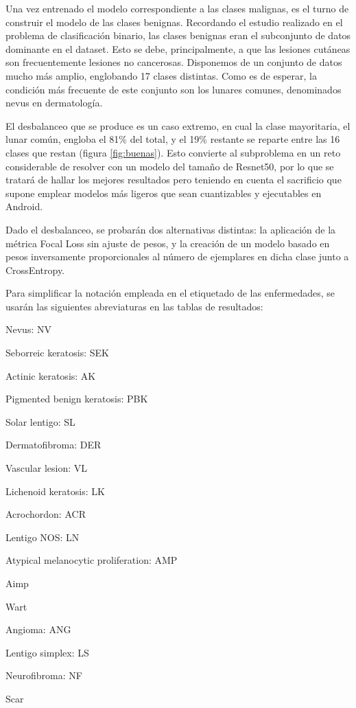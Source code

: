 Una vez entrenado el modelo correspondiente a las clases malignas, es el turno de construir el modelo de las clases benignas. Recordando el estudio realizado en el problema de clasificación binario, las clases benignas eran el subconjunto de datos dominante en el dataset. Esto se debe, principalmente, a que las lesiones cutáneas son frecuentemente lesiones no cancerosas. Disponemos de un conjunto de datos mucho más amplio, englobando 17 clases distintas.  Como es de esperar, la condición más frecuente de este conjunto son los lunares comunes, denominados nevus en dermatología.

El desbalanceo que se produce es un caso extremo, en cual la clase mayoritaria, el lunar común, engloba el 81\% del total, y el 19\% restante se reparte entre las 16 clases que restan (figura  \ref{fig:buenas}). Esto convierte al subproblema en un reto considerable de resolver con un modelo del tamaño de Resnet50, por lo que se tratará de hallar los mejores resultados pero teniendo en cuenta el sacrificio que supone emplear modelos más ligeros que sean cuantizables y ejecutables en Android.

Dado el desbalanceo, se probarán dos alternativas distintas: la aplicación de la métrica Focal Loss sin ajuste de pesos, y la creación de un modelo basado en pesos inversamente proporcionales al número de ejemplares en dicha clase junto a CrossEntropy.

Para simplificar la notación empleada en el etiquetado de las enfermedades, se usarán las siguientes abreviaturas en las tablas de resultados:
\begin{multiitem}
	\item Nevus: NV
	\item Seborreic keratosis: SEK 
	\item Actinic keratosis: AK            
	\item Pigmented benign keratosis: PBK 
	\item Solar lentigo: SL
	\item Dermatofibroma: DER 
	\item Vascular lesion: VL                        
	\item Lichenoid keratosis: LK
	\item Acrochordon: ACR
	\item Lentigo NOS: LN
	\item Atypical melanocytic proliferation: AMP
	\item Aimp                                     
	\item 	Wart                                     
	\item Angioma: ANG                               
	\item Lentigo simplex: LS
	\item 	Neurofibroma: NF
	\item 	Scar 
\end{multiitem}

